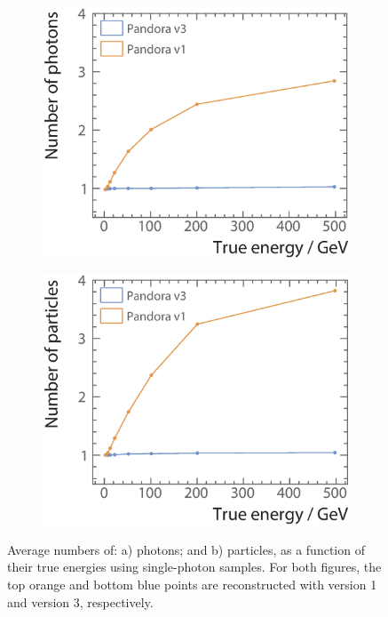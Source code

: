 \begin{figure}[tbph]
\centering
    \begin{subfigure}[b]{0.45\textwidth}
        \includegraphics[width=\textwidth]{photon/SingleN_p2}
        \caption{}
        \label{fig:photonSingleN_p}
    \end{subfigure}
    \begin{subfigure}[b]{0.45\textwidth}
        \includegraphics[width=\textwidth]{photon/SingleN_all2}
        \caption{}
        \label{fig:photonSingleN_all}
    \end{subfigure}
\caption[Average number of reconstructed photons and reconstructed particles, as a function of their true energy using single photon sample.]
{Average numbers of: a) photons; and b) particles, as a function of their true energies using single-photon samples. For both figures, the top orange and bottom blue points are reconstructed with \pandora version 1 and version 3, respectively.}
\label{fig:photonSingleN}
\end{figure}


